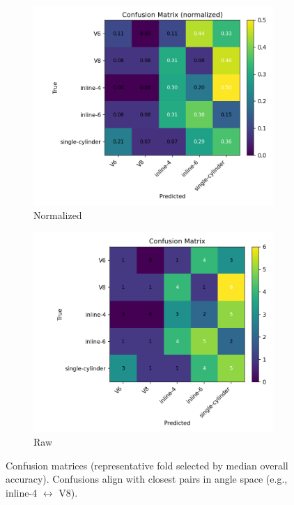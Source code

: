 \documentclass[11pt]{article}
\begin{document}
\begin{figure}[!htbp]
\centering
\begin{subfigure}{0.48\linewidth}
  \includegraphics[width=\linewidth]{rep_confusion_norm.png}
  \caption{Normalized}
\end{subfigure}\hfill
\begin{subfigure}{0.48\linewidth}
  \includegraphics[width=\linewidth]{rep_confusion_raw.png}
  \caption{Raw}
\end{subfigure}
\caption{Confusion matrices (representative fold selected by median overall accuracy). Confusions align with closest pairs in angle space (e.g., inline-4 $\leftrightarrow$ V8).}
\label{fig:confusion}
\end{figure}
\end{document}
